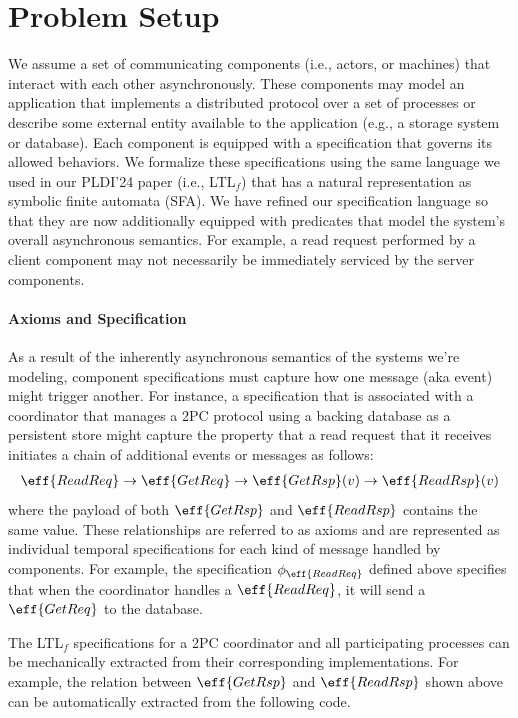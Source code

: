 \section{Problem Setup}

We assume a set of communicating components (i.e., actors, or 
machines) that interact with each other asynchronously. These
components may model an application that implements a distributed
protocol over a set of processes or describe some external entity
available to the application (e.g., a storage system or database).
Each component is equipped with a specification that governs its
allowed behaviors.  We formalize these specifications using the same
language we used in our PLDI'24 paper (i.e., LTL$_f$) that has a
natural representation as symbolic finite automata (SFA).  We have
refined our specification language so that they are now additionally
equipped with predicates that model the system's overall asynchronous
semantics.  For example, a read request performed by a client
component may not necessarily be immediately serviced by the server
components.

\paragraph{Axioms and Specification} As a result of the inherently
asynchronous semantics of the systems we're modeling, component
specifications must capture how one message (aka event) might trigger
another. For instance, a specification that is associated with a
coordinator that manages a 2PC protocol using a backing database as a
persistent store might capture the property that a read request that
it receives initiates a chain of additional events or messages as
follows:
\begin{align*}
    \eff{ReadReq} \to \eff{GetReq} \to \eff{GetRsp}(v) \to
    \eff{ReadRsp}(v)
\end{align*}
\noindent where the payload of both $\eff{GetRsp}$ and $\eff{ReadRsp}$
contains the same value. These relationships are referred to as axioms
and are represented as individual temporal specifications for each
kind of message handled by components. For example, the specification
$\phi_{\eff{ReadReq}}$ defined above specifies that when the
coordinator handles a $\eff{ReadReq}$, it will send a $\eff{GetReq}$
to the database.

The LTL$_f$ specifications for a 2PC coordinator and all participating
processes can be mechanically extracted from their corresponding
 implementations. For example, the relation between
$\eff{GetRsp}$ and $\eff{ReadRsp}$ shown above can be automatically
extracted from the following  code.

